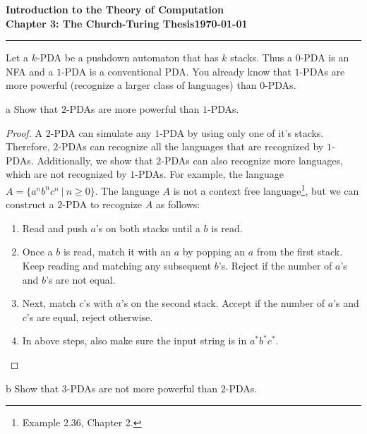 \documentclass[11pt]{article}
\newcommand{\dated}{\today}
\begin{document}
\textbf{Introduction to the Theory of
Computation}\hfill\textbf{\myname}\\[0.01in]
\textbf{Chapter 3: The Church-Turing Thesis}\hfill\textbf{\dated}\\
\smallskip\hrule\bigskip

\begin{problem}{3.9}
Let a $k$-PDA be a pushdown automaton that has $k$ stacks. Thus a $0$-PDA is an NFA and a $1$-PDA is a conventional PDA. You already know that $1$-PDAs are more powerful (recognize a larger class of languages) than $0$-PDAs.
\end{problem}

\begin{problem}[Part]{a}
Show that $2$-PDAs are more powerful than $1$-PDAs.
\end{problem}

\begin{proof}
A $2$-PDA can simulate any $1$-PDA by using only one of it's stacks. Therefore, $2$-PDAs can recognize all the languages that are recognized by $1$-PDAs. Additionally, we show that $2$-PDAs can also recognize more languages, which are not recognized by $1$-PDAs. For example, the language $A = \{a^nb^nc^n \ | \ n \geq 0 \}$. The language $A$ is not a context free language\footnote{Example 2.36, Chapter 2.}, but we can construct a $2$-PDA to recognize $A$ as follows:
\begin{enumerate}
\item Read and push $a$'s on both stacks until a $b$ is read.
\item Once a $b$ is read, match it with an $a$ by popping an $a$ from the first stack. Keep reading and matching any subsequent $b$'s. Reject if the number of $a$'s and $b$'s are not equal.
\item Next, match $c$'s with $a$'s on the second stack. Accept if the number of $a$'s and $c$'s are equal, reject otherwise.
\item In above steps, also make sure the input string is in $a^*b^*c^*$.
\end{enumerate}
\end{proof}

\begin{problem}[Part]{b}
Show that $3$-PDAs are not more powerful than $2$-PDAs.
\end{problem}
\end{document}
